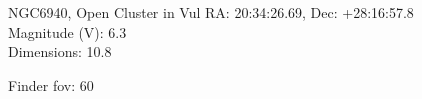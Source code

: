 \begin{block}{NGC6940, Open Cluster in Vul}
    RA: 20:34:26.69, Dec: +28:16:57.8 \\ 
    Magnitude (V): 6.3 \\ 
    Dimensions: 10.8 

    Finder fov: 60 
\end{block}
